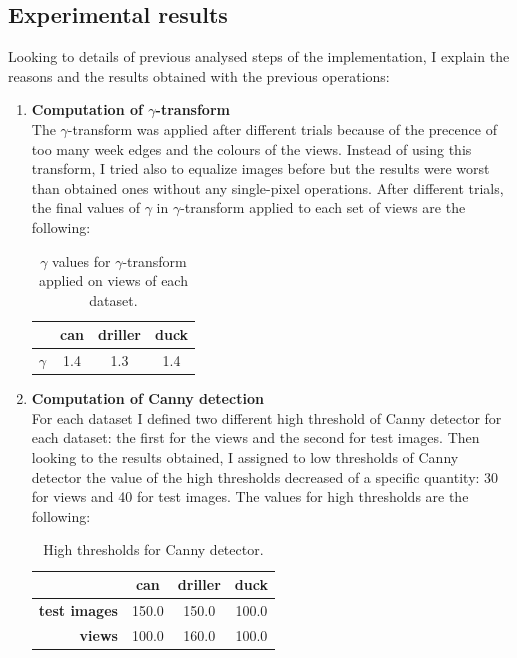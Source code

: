 \documentclass{article}
\begin{document}
\subsection{Experimental results}\label{exp}
Looking to details of previous analysed steps of the implementation, I explain the reasons and the results obtained with the previous operations:
\begin{enumerate}
\item{\textbf{Computation of $\gamma$-transform}\\
The $\gamma$-transform was applied after different trials because of the precence of too many week edges and the colours of the views. Instead of using this transform, I tried also to equalize images before but the results were worst than obtained ones without any single-pixel operations. After different trials, the final values of $\gamma$ in $\gamma$-transform applied to each set of views are the following:
\begin{table}[H]
\footnotesize\centering
\begin{tabular}{rccc}
\cline{2-4}
& \textbf{can} & \textbf{driller} & \textbf{duck}\\
\hline
{$\mathtt{\gamma}$} & {1.4} & {1.3} & {1.4}\\
\hline
\end{tabular}
\caption{\footnotesize{$\gamma$ values for $\gamma$-transform applied on views of each dataset.}}
\end{table}
}
\item{\textbf{Computation of Canny detection}\\
For each dataset I defined two different high threshold of Canny detector for each dataset: the first for the views and the second for test images. Then looking to the results obtained, I assigned to low thresholds of Canny detector the value of the high thresholds decreased of a specific quantity: 30 for views and 40 for test images. The values for high thresholds are the following:
\begin{table}[H]
\footnotesize\centering
\begin{tabular}{rccc}
\cline{2-4}
& \textbf{can} & \textbf{driller} & \textbf{duck}\\
\hline
\textbf{test images} & {150.0} & {150.0} & {100.0}\\
\hline
\textbf{views} & {100.0} & {160.0} & {100.0}\\
\hline
\end{tabular}
\caption{\footnotesize{High thresholds for Canny detector.}}
\end{table}
}
\end{enumerate}
\end{document}
